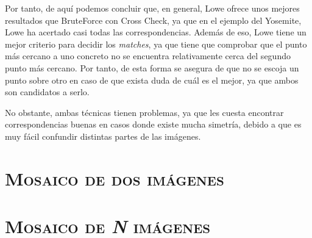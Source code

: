 \documentclass[11pt,a4paper]{article}
\begin{document}
Por tanto, de aquí podemos concluir que, en general, Lowe ofrece unos mejores resultados que
BruteForce con Cross Check, ya que en el ejemplo del Yosemite, Lowe ha acertado casi todas
las correspondencias. Además de eso, Lowe tiene un mejor criterio para decidir los \textit{matches},
ya que tiene que comprobar que el punto más cercano a uno concreto no se encuentra relativamente
cerca del segundo punto más cercano. Por tanto, de esta forma se asegura de que no se escoja
un punto sobre otro en caso de que exista duda de cuál es el mejor, ya que ambos son candidatos
a serlo.

No obstante, ambas técnicas tienen problemas, ya que les cuesta
encontrar correspondencias buenas en casos donde existe mucha simetría, debido
a que es muy fácil confundir distintas partes de las imágenes.

\section{\textsc{Mosaico de dos imágenes}}

\section{\textsc{Mosaico de \textit{N} imágenes}}

\newpage



\end{document}
